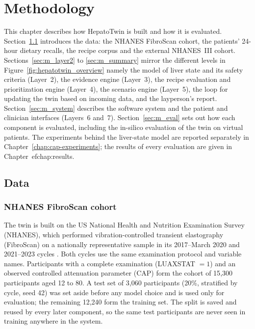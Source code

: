 \chapter{Methodology}
\label{chap:methodology}

This chapter describes how HepatoTwin is built and how it is evaluated.
Section~\ref{sec:m_data} introduces the data: the NHANES FibroScan cohort,
the patients' 24-hour dietary recalls, the recipe corpus and the external
NHANES~III cohort. Sections~\ref{sec:m_layer2} to \ref{sec:m_summary} mirror the different levels in
Figure~\ref{fig:hepatotwin_overview} namely the model of liver state and its safety criteria (Layer~2), 
the evidence engine (Layer~3), the recipe evaluation and prioritization engine (Layer~4), the scenario engine (Layer~5), 
the loop for updating the twin based on incoming data, and the layperson's report. Section~\ref{sec:m_system} describes the software
system and the patient and clinician interfaces (Layers~6 and~7).
Section~\ref{sec:m_eval} sets out how each component is evaluated, including
the in-silico evaluation of the twin on virtual patients. The experiments
behind the liver-state model are reported separately in
Chapter~\ref{chap:cap-experiments}; the results of every evaluation are given in
Chapter~ef{chap:results}.

\section{Data}
\label{sec:m_data}

\subsection{NHANES FibroScan cohort}

The twin is built on the US National Health and Nutrition Examination Survey
(NHANES), which performed vibration-controlled transient elastography
(FibroScan) on a nationally representative sample in its 2017--March 2020 and
2021--2023 cycles \cite{nhanes_lux}. Both cycles use the same examination
protocol and variable names. Participants with a complete examination
(LUAXSTAT $=1$) and an observed controlled attenuation parameter (CAP) form
the cohort of 15{,}300 participants aged 12 to 80. A test set of 3{,}060
participants (20\%, stratified by cycle, seed 42) was set aside before any
model choice and is used only for evaluation; the remaining 12{,}240 form the
training set. The split is saved and reused by every later component, so the
same test participants are never seen in training anywhere in the system.

